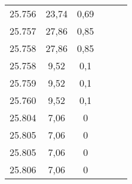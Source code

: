 \begin{tabularx}{9.5cm}{@{}ccc|ccc@{}}
25.756 & 23,74 & 0,69 &  &  & \\
25.757 & 27,86 & 0,85 &  &  & \\
25.758 & 27,86 & 0,85 &  &  & \\
25.758 & 9,52 & 0,1 &  &  & \\
25.759 & 9,52 & 0,1 &  &  & \\
25.760 & 9,52 & 0,1 &  &  & \\
25.804 & 7,06 & 0 &  &  & \\
25.805 & 7,06 & 0 &  &  & \\
25.805 & 7,06 & 0 &  &  & \\
25.806 & 7,06 & 0 &  &  & \\
  \bottomrule
\end{tabularx}
